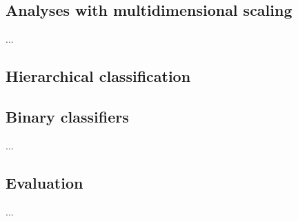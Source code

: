 \documentclass[10pt]{article}
\newif\ifen
\newif\ifde
\newcommand{\en}[1]{\ifen#1\fi}
\newcommand{\de}[1]{\ifde#1\fi}
\begin{document}
		\subsection{Analyses with multidimensional scaling}
			\noindent ...
		
		\subsection{Hierarchical classification}
			\de{Durch die Verwendung eines einzigen Modelles für alle Klassen, sind die bisherigen Klassifikatoren darauf trainiert, den Verlust am Klassenausgabevektor zu minimieren. Jede bisher verwendete Klasse hat den gleichen Rang sowohl beim Training, als auch bei der Klassifizierung. Die Vorhersage von "Pizza" kostet genauso viel wie die Vorhersage von "Martini".}
			\en{By using a single model for all classes, previous classifiers have been trained to minimize the loss of the class output vector. Each class used so far has the same rank in both training and classification. The prediction of "Pizza" costs the same as the prediction of "Martini".}

			\de{Die menschliche Fähigkeit Objekte einordnen zu können, funktioniert nicht nur auf einer Ebene. Kategorien werden sich natürlich überlappen und eine hierarchische Struktur aufweisen. So wird ein Mensch ein Bild beispielsweise unter "Pizza", "Thunfischpizza" oder sogar "Fastfood" einordnen, was so gesehen korrekt ist. Je nach Einordnung findet hier lediglich ein "Informationsverlust" statt. Jedoch wird der Mensch eine "Pizza" meist nicht fälschlicherweise als "Martini" verwechseln, welcher eher der Kategorie "Getränk" oder "Cocktail" einzuordnen ist\autocite{rosch2004basic}.}
			\en{The human ability to classify objects does not only work on one level. Categories will naturally overlap and have a hierarchical structure. For example, a human will classify a picture under "pizza", "tuna pizza" or even "fast food", which is correct from this point of view. Depending on the classification, there will only be a "loss of information". However, a person will not mistake a "pizza" as a "Martini", which is more likely to be classified as a "drink" or "cocktail"\autocite{rosch2004basic}.}
		
		\subsection{Binary classifiers}
			\noindent ...
		
		\subsection{Evaluation}
			\noindent ...
		
\end{document}
